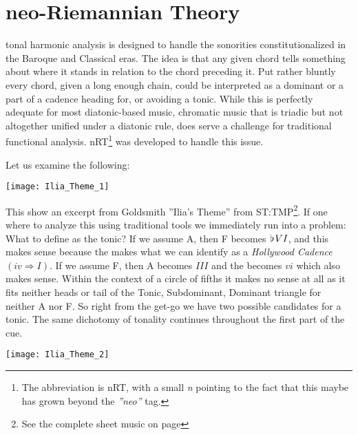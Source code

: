 
\chapter{neo-Riemannian Theory}\label{ch:nrt}
\morefloats

 tonal harmonic analysis is designed to handle the sonorities constitutionalized in the Baroque and Classical eras. The idea is that any given chord tells something about where it stands in relation to the chord preceding it. Put rather bluntly every chord, given a long enough chain, could be interpreted as a dominant or a part of a cadence heading for, or avoiding a tonic. While this is perfectly adequate for most diatonic-based music, chromatic music that is triadic but not altogether unified under a diatonic rule, does serve a challenge for traditional functional analysis. \acf{nRT}\footnote{The abbreviation is nRT, with a small \textit{n} pointing to the fact that this maybe has grown beyond the \textit{''neo''} tag. } was developed to handle this issue.

Let us examine the following:

\begin{figure*}[h!]
\texttt{[image: Ilia\_Theme\_1]}
	\caption{Ilia's Theme 1}
	\label{Ilia_Theme_1}
\end{figure*}

\noindent This show an excerpt from Goldsmith ''Ilia's Theme'' from \ac{ST:TMP}\footnote{See the complete sheet music on page \pageref{Ilias_Theme}}. If one where to analyze this using traditional tools we immediately run into a problem: What to define as the tonic? If we assume A, then F becomes \(\hspace*{0.18ex}\flat\hspace*{0.18ex}{VI}\), and this makes sense because the  makes what we can identify as a \textit{Hollywood Cadence} \(({iv}\Rightarrow{I})\). If we assume F, then A becomes \(III\) and the  becomes \(vi\) which also makes sense. Within the context of a circle of fifths it makes no sense at all as it fits neither heads or tail of the Tonic, Subdominant, Dominant triangle for neither A nor F. So right from the get-go we have two possible candidates for a tonic. The same dichotomy of tonality continues throughout the first part of the cue.

\begin{figure*}[h!]
\texttt{[image: Ilia\_Theme\_2]}
	\caption{Ilia's Theme 2}
	\label{Ilia_Theme_2}
\end{figure*}

